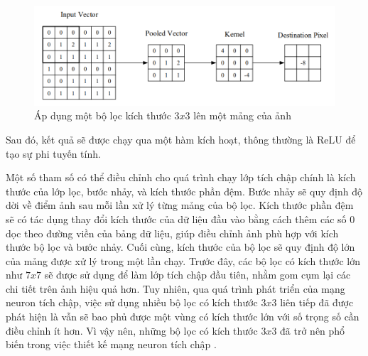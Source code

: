 \begin{figure}[H]
  \centering
  \includegraphics[scale=0.5]{pics/Chapter3/conv_kernel.png}
  \caption{Áp dụng một bộ lọc kích thước $3x3$ lên một mảng của ảnh \cite{o2015introduction}}
  \label{fig:enter-label}
\end{figure}

Sau đó, kết quả sẽ được chạy qua một hàm kích hoạt, thông thường là ReLU để tạo sự phi tuyến tính.

Một số tham số có thể điều chỉnh cho quá trình chạy lớp tích chập chính là kích thước của lớp lọc, bước nhảy, và kích thước phần đệm. Bước nhảy sẽ quy định độ dời về điểm ảnh sau mỗi lần xử lý từng mảng của bộ lọc. Kích thước phần đệm sẽ có tác dụng thay đổi kích thước của dữ liệu đầu vào bằng cách thêm các số 0 dọc theo đường viền của bảng dữ liệu, giúp điều chỉnh ảnh phù hợp với kích thước bộ lọc và bước nhảy. Cuối cùng, kích thước của bộ lọc sẽ quy định độ lớn của mảng được xử lý trong một lần chạy. Trước đây, các bộ lọc có kích thước lớn như $7x7$ sẽ được sử dụng để làm lớp tích chập đầu tiên, nhằm gom cụm lại các chi tiết trên ảnh hiệu quả hơn. Tuy nhiên, qua quá trình phát triển của mạng neuron tích chập, việc sử dụng nhiều bộ lọc có kích thước $3x3$ liên tiếp đã được phát hiện là vẫn sẽ bao phủ được một vùng có kích thước lớn với số trọng số cần điều chỉnh ít hơn. Vì vậy nên, những bộ lọc có kích thước $3x3$ đã trở nên phổ biến trong việc thiết kế mạng neuron tích chập \cite{simonyan2015deep}.


